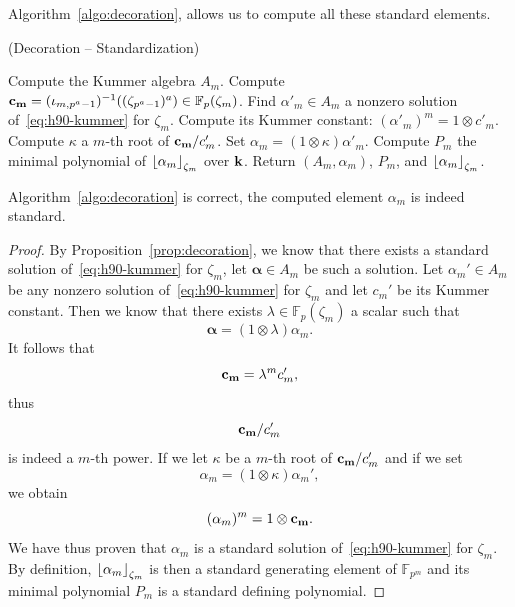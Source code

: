 Algorithm~\ref{algo:decoration}, allows us to compute all these standard
elements.
\begin{algorithm}
  \caption{(Decoration -- Standardization)}
  \label{algo:decoration}
  \begin{algorithmic}[1]
  \State Compute the Kummer algebra $A_m$.
  \State Compute $\mathbf{c_{m}}=(\iota_{m, p^a-1})^{-1}((\zeta_{p^a-1})^a)\in\mathbb{F}_p(\zeta_m)$.
  \State Find $\alpha'_m\in A_m$ a nonzero solution of~\eqref{eq:h90-kummer} for $\zeta_m$.
  \State Compute its Kummer constant: $(\alpha'_m)^m=1\otimes c'_m$.
  \State Compute $\kappa$ a $m$-th root of $\mathbf{c_{m}}/ c'_m$.
  \State Set $\alpha_{m}=(1\otimes\kappa)\alpha'_m$.
  \State Compute $P_m$ the minimal polynomial of $\left\lfloor \alpha_{m} \right\rfloor_{\zeta_m}$
  over $\mathbf{k}$.
  \State Return $(A_m,\alpha_m)$, $P_m$, and $\left\lfloor \alpha_m \right\rfloor_{\zeta_m}$.
  \end{algorithmic}
\end{algorithm}
\begin{prop}
  Algorithm~\ref{algo:decoration} is correct, \ie the computed element
  $\alpha_m$ is indeed standard. 
\end{prop}
\begin{proof}
  By Proposition~\ref{prop:decoration}, we know that there exists a standard
  solution of~\eqref{eq:h90-kummer} for $\zeta_m$, let $\pmb{\alpha}\in A_m$ be such a
  solution. Let $\alpha_m'\in A_m$ be any nonzero solution
  of~\eqref{eq:h90-kummer} for $\zeta_m$ and let $c_m'$ be its Kummer constant.
  Then we know that there exists $\lambda\in\mathbb{F}_p(\zeta_m)$ a scalar such that
  \[
    \pmb\alpha = (1\otimes\lambda)\alpha_m.
  \]
  It follows that 
  \[
    \mathbf{c_{m}} = \lambda^m c_m',
  \]
  thus 
  \[
    \mathbf{c_{m}}/c_m'
  \]
  is indeed a $m$-th power. If we let $\kappa$ be a $m$-th root of
  $\mathbf{c_{m}}/c_m'$ and if we set 
  \[
    \alpha_m = (1\otimes\kappa)\alpha_m',
  \]
  we obtain
  \[
    (\alpha_m)^m = 1\otimes\mathbf{c_{m}}.
  \]
  We have thus proven that $\alpha_m$ is a standard solution
  of~\eqref{eq:h90-kummer} for $\zeta_m$. By definition,
  $\left\lfloor \alpha_m \right\rfloor_{\zeta_m}$ is then a standard generating element of
  $\mathbb{F}_{p^{m}}$ and its minimal polynomial $P_m$ is a standard defining
  polynomial.
\end{proof}

